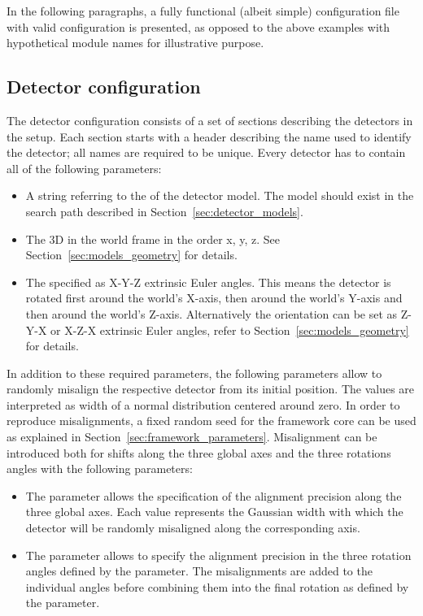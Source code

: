 In the following paragraphs, a fully functional (albeit simple) configuration file with valid configuration is presented, as opposed to the above examples with hypothetical module names for illustrative purpose.

\subsection{Detector configuration}
\label{sec:detector_config}
The detector configuration consists of a set of sections describing the detectors in the setup.
Each section starts with a header describing the name used to identify the detector; all names are required to be unique.
Every detector has to contain all of the following parameters:
\begin{itemize}
\item A string referring to the  of the detector model.
The model should exist in the search path described in Section~\ref{sec:detector_models}.
\item The 3D  in the world frame in the order x, y, z.
See Section~\ref{sec:models_geometry} for details.
\item The  specified as X-Y-Z extrinsic Euler angles.
This means the detector is rotated first around the world's X-axis, then around the world's Y-axis and then around the world's Z-axis.
Alternatively the orientation can be set as Z-Y-X or X-Z-X extrinsic Euler angles, refer to Section~\ref{sec:models_geometry} for details.
\end{itemize}

In addition to these required parameters, the following parameters allow to randomly misalign the respective detector from its initial position. The values are interpreted as width of a normal distribution centered around zero.
In order to reproduce misalignments, a fixed random seed for the framework core can be used as explained in Section~\ref{sec:framework_parameters}.
Misalignment can be introduced both for shifts along the three global axes and the three rotations angles with the following parameters:
\begin{itemize}
\item The parameter  allows the specification of the alignment precision along the three global axes. Each value represents the Gaussian width with which the detector will be randomly misaligned along the corresponding axis.
\item The parameter  allows to specify the alignment precision in the three rotation angles defined by the  parameter. The misalignments are added to the individual angles before combining them into the final rotation as defined by the  parameter.
\end{itemize}

